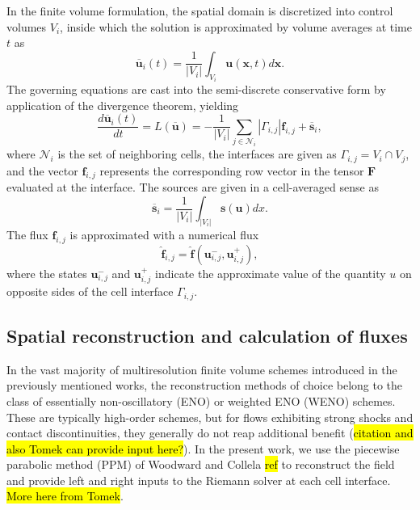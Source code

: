 \documentclass[]{article}
\begin{document}
    In the finite volume formulation, the spatial domain is discretized into
    control volumes $V_{i}$, inside which the solution is approximated by volume
    averages at time $t$ as
    \begin{equation}
        \overline{\bm{u}}_{i}(t) = \frac{1}{|V_{i}|} \int_{V_{i}} \bm{u}(\bm{x},t) d\bm{x}.
    \end{equation}
    The governing equations are cast into the semi-discrete conservative form
    by application of the divergence theorem, yielding
    \begin{equation}
        \frac{d \overline{\bm{u}}_{i}(t)}{dt} = L(\overline{\bm{u}}) =  -\frac{1}{|V_{i}|} \sum_{j\in \mathcal{N}_{i}} |
        \Gamma_{i,j}| \bm{f}_{i,j}
        + \overline{\bm{s}}_{i},
        \label{ode}
    \end{equation}
    where $\mathcal{N}_{i}$ is the set of neighboring cells, the interfaces are
    given as $\Gamma_{i,j} = V_{i} \cap V_{j}$, and the vector $\bm{f}_{i,j}$
    represents the corresponding row vector in the tensor $\bm{F}$ evaluated at
    the interface.  The sources are given in a cell-averaged sense as
    \begin{equation}
        \overline{\bm{s}}_{i} = \frac{1}{|V_{i}|} \int_{|V_{i}|} \bm{s}(\bm{u}) dx.
    \end{equation}
    The flux $\bm{f}_{i,j}$ is approximated with a numerical flux
    \begin{equation}
        \hat{\bm{f}}_{i,j} = \hat{\bm{f}}(\bm{u}^{-}_{i,j}, \bm{u}^{+}_{i,j}),
        \label{flux}
    \end{equation}
    where the states $\bm{u}^{-}_{i,j}$ and $\bm{u}^{+}_{i,j}$ indicate the approximate
    value of the quantity $u$ on opposite sides of the cell
    interface $\Gamma_{i,j}$.

    \subsection{Spatial reconstruction and calculation of fluxes}

        In the vast majority of multiresolution finite volume schemes
        introduced in the previously mentioned works, the reconstruction
        methods of choice belong to the class of essentially non-oscillatory
        (ENO) or weighted ENO (WENO) schemes. These are typically
        high-order schemes, but for flows exhibiting strong shocks and
        contact discontinuities, they generally do not
        reap additional benefit (\hl{citation and also Tomek can provide input
        here?}). In the present work, we use the piecewise parabolic method
        (PPM) of Woodward and Collela \hl{ref} to reconstruct the field and
        provide left and right inputs to the Riemann solver at each cell
        interface. \hl{More here from Tomek}.
\end{document}
